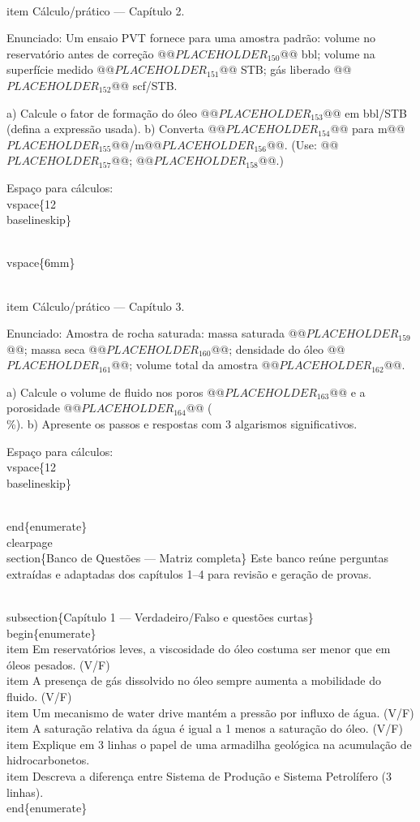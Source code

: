 \documentclass[11pt,a4paper]{article}
\begin{document}
\begin{enumerate}
{\\item Cálculo/prático — Capítulo 2.

Enunciado: Um ensaio PVT fornece para uma amostra padrão: volume no reservatório antes de correção @@$PLACEHOLDER_{150}$@@ bbl; volume na superfície medido @@$PLACEHOLDER_{151}$@@ STB; gás liberado @@$PLACEHOLDER_{152}$@@ scf/STB.

a) Calcule o fator de formação do óleo @@$PLACEHOLDER_{153}$@@ em bbl/STB (defina a expressão usada).  
b) Converta @@$PLACEHOLDER_{154}$@@ para m@@$PLACEHOLDER_{155}$@@/m@@$PLACEHOLDER_{156}$@@. (Use: @@$PLACEHOLDER_{157}$@@; @@$PLACEHOLDER_{158}$@@.)

Espaço para cálculos: \\vspace\{12\\baselineskip\}

\\vspace\{6mm\}

\\item Cálculo/prático — Capítulo 3.

Enunciado: Amostra de rocha saturada: massa saturada @@$PLACEHOLDER_{159}$@@; massa seca @@$PLACEHOLDER_{160}$@@; densidade do óleo @@$PLACEHOLDER_{161}$@@; volume total da amostra @@$PLACEHOLDER_{162}$@@.

a) Calcule o volume de fluido nos poros @@$PLACEHOLDER_{163}$@@ e a porosidade @@$PLACEHOLDER_{164}$@@ (\\\%).  
b) Apresente os passos e respostas com 3 algarismos significativos.

Espaço para cálculos: \\vspace\{12\\baselineskip\}

\\end\{enumerate\}
\\clearpage
\\section\{Banco de Questões — Matriz completa\}
Este banco reúne perguntas extraídas e adaptadas dos capítulos 1–4 para revisão e geração de provas.

\\subsection\{Capítulo 1 — Verdadeiro/Falso e questões curtas\}
\\begin\{enumerate\}
\\item Em reservatórios leves, a viscosidade do óleo costuma ser menor que em óleos pesados. (V/F)
\\item A presença de gás dissolvido no óleo sempre aumenta a mobilidade do fluido. (V/F)
\\item Um mecanismo de water drive mantém a pressão por influxo de água. (V/F)
\\item A saturação relativa da água é igual a 1 menos a saturação do óleo. (V/F)
\\item Explique em 3 linhas o papel de uma armadilha geológica na acumulação de hidrocarbonetos.
\\item Descreva a diferença entre Sistema de Produção e Sistema Petrolífero (3 linhas).
\\end\{enumerate\}

}
\end{enumerate}
\end{document}
